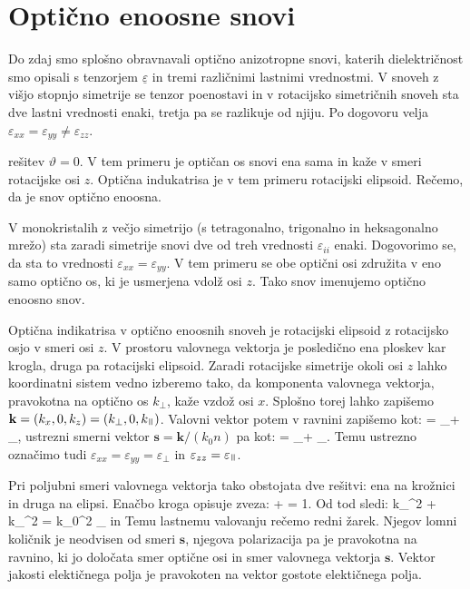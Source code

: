 \section{Optično enoosne snovi}
Do zdaj smo splošno obravnavali optično anizotropne snovi, katerih dielektričnost
smo opisali s tenzorjem $\underline{\varepsilon}$ in tremi različnimi lastnimi vrednostmi. 
V snoveh z višjo stopnjo simetrije se tenzor poenostavi in v rotacijsko
simetričnih snoveh sta dve lastni vrednosti enaki, tretja pa se razlikuje od njiju.
Po dogovoru velja $\varepsilon_{xx} = \varepsilon_{yy}\neq \varepsilon_{zz}$.




rešitev $\vartheta =0$.
V tem primeru je optičan os snovi ena sama in kaže v smeri rotacijske osi $z$. Optična
indukatrisa je v tem primeru rotacijski elipsoid. Rečemo, da je snov optično enoosna. 



V monokristalih z večjo simetrijo (s tetragonalno, trigonalno in heksagonalno mrežo) sta
zaradi simetrije snovi dve od treh vrednosti $\varepsilon_{ii}$ enaki. Dogovorimo se, da sta 
to vrednosti $\varepsilon_{xx} = \varepsilon_{yy}$. V tem primeru se obe optični osi združita
v eno samo optično os, ki je usmerjena vdolž osi $z$. Tako snov imenujemo optično enoosno snov. 



Optična indikatrisa v optično enoosnih snoveh je rotacijski elipsoid z rotacijsko osjo v smeri osi $z$. 
V prostoru valovnega vektorja je posledično ena ploskev kar krogla, druga pa rotacijski elipsoid.
Zaradi rotacijske  simetrije okoli osi $z$ lahko koordinatni sistem vedno izberemo tako, da
komponenta valovnega vektorja, pravokotna na optično os $k_\perp$, kaže vzdož osi $x$. Splošno 
torej lahko zapišemo $\mathbf{k} = (k_x, 0, k_z) = (k_\perp, 0, k_\myparallel)$. 
Valovni vektor potem v ravnini zapišemo kot:
\beq
{} = _\perp + _\myparallel,
\eeq
ustrezni smerni vektor $\mathbf{s}= \mathbf{k}/(k_0n)$ pa kot:
\beq
{} = _\perp + _\myparallel.
\eeq
Temu ustrezno označimo tudi $\varepsilon_{xx} = \varepsilon_{yy} = \varepsilon_\perp$ in 
$\varepsilon_{zz} = \varepsilon_\myparallel$. 

Pri poljubni smeri valovnega vektorja tako obstojata dve rešitvi: ena na krožnici in druga
na elipsi. Enačbo kroga opisuje zveza:
\beq
{}+  = 1.
\eeq
Od tod sledi:
\beq
k_\perp^2 + k_\myparallel^2 = k_0^2 \varepsilon_\perp
\eeq
in
Temu lastnemu valovanju rečemo redni žarek. Njegov lomni količnik je neodvisen od smeri $\mathbf{s}$,
njegova polarizacija pa je pravokotna na ravnino, ki jo določata smer optične osi in smer valovnega
vektorja $\mathbf{s}$. Vektor jakosti elektičnega polja je pravokoten na vektor gostote elektičnega polja. 

